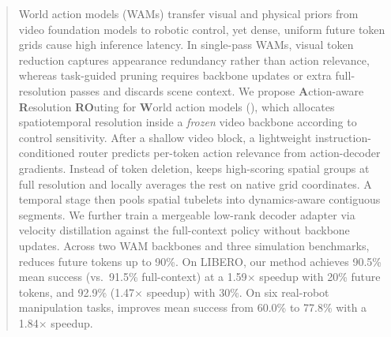 \begin{abstract}
    World action models (WAMs) transfer visual and physical priors from video foundation models to robotic control, yet dense, uniform future token grids cause high inference latency.
    In single-pass WAMs, visual token reduction captures appearance redundancy rather than action relevance, whereas task-guided pruning requires backbone updates or extra full-resolution passes and discards scene context.
    We propose \textbf{A}ction-aware \textbf{R}esolution \textbf{RO}uting for \textbf{W}orld action models (\method), which allocates spatiotemporal resolution inside a \emph{frozen} video backbone according to control sensitivity.
    After a shallow video block, a lightweight instruction-conditioned router predicts per-token action relevance from action-decoder gradients.
    Instead of token deletion, \method keeps high-scoring spatial groups at full resolution and locally averages the rest on native grid coordinates.
    A temporal stage then pools spatial tubelets into dynamics-aware contiguous segments.
    We further train a mergeable low-rank decoder adapter via velocity distillation against the full-context policy without backbone updates.
    Across two WAM backbones and three simulation benchmarks, \method reduces future tokens up to 90\%.
    On LIBERO, our method achieves 90.5\% mean success (vs.\ 91.5\% full-context) at a 1.59$\times$ speedup with 20\% future tokens, and 92.9\% (1.47$\times$ speedup) with 30\%.
    On six real-robot manipulation tasks, \method improves mean success from 60.0\% to 77.8\% with a 1.84$\times$ speedup.
\end{abstract}
